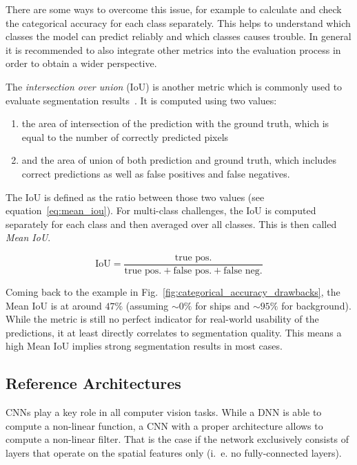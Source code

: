 There are some ways to overcome this issue, for example to calculate and check the categorical accuracy for each class separately. This helps to understand which classes the model can predict reliably and which classes causes trouble. In general it is recommended to also integrate other metrics into the evaluation process in order to obtain a wider perspective.

The \emph{intersection over union} (IoU) is another metric which is commonly used to evaluate segmentation results~\cite{pascal_voc15}. It is computed using two values:
\begin{enumerate}
    \item the area of intersection of the prediction with the ground truth, which is equal to the number of correctly predicted pixels
    \item and the area of union of both prediction and ground truth, which includes correct predictions as well as false positives and false negatives.
\end{enumerate}

The IoU is defined as the ratio between those two values (see equation~\ref{eq:mean_iou}). For multi-class challenges, the IoU is computed separately for each class and then averaged over all classes. This is then called \emph{Mean IoU}.

\begin{equation}
    \label{eq:mean_iou}
    \text{IoU} = \frac{\text{true pos.}}{\text{true pos.}+\text{false pos.}+\text{false neg.}}
\end{equation}

Coming back to the example in Fig.~\ref{fig:categorical_accuracy_drawbacks}, the Mean IoU is at around $47\%$ (assuming $\sim 0\%$ for ships and $\sim 95\%$ for background). While the metric is still no perfect indicator for real-world usability of the predictions, it at least directly correlates to segmentation quality. This means a high Mean IoU implies strong segmentation results in most cases.

\subsection{Reference Architectures}
\label{sec:ref_archs}
CNNs play a key role in all computer vision tasks. While a DNN is able to compute a non-linear function, a CNN with a proper architecture allows to compute a non-linear filter. That is the case if the network exclusively consists of layers that operate on the spatial features only (i.~e. no fully-connected layers).


